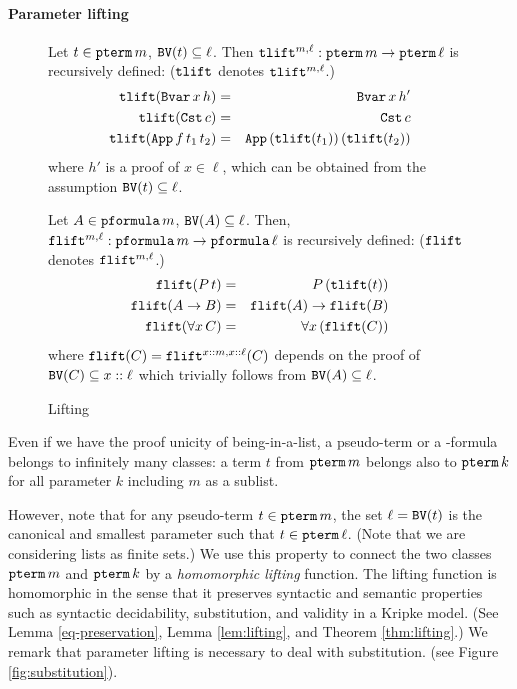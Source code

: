 \documentclass{svjour3}                     %
\newcommand{\tm}{\subseteq}
\newcommand{\tApp}{\textup{\tt App}}
\newcommand{\tBvar}{\textup{\tt Bvar}}
\newcommand{\tCst}{\textup{\tt Cst}}
\newcommand{\tFvar}{\textup{\tt Fvar}}
\newcommand{\tpterm}{\textup{\tt pterm}}
\newcommand{\tpfml}{\textup{\tt pformula}}
\newcommand{\tPH}{\textup{\tt BV}}
\newcommand{\ttlift}{\textup{\tt tlift}}
\newcommand{\tflift}{\textup{\tt flift}}
\begin{document}
\paragraph{\bf Parameter lifting}

\begin{figure}[t]
  Let $t \in \tpterm \,m$, $\tPH(t) \subseteq \ell$. Then $\ttlift^{m, \ell} : \tpterm\, m \to \tpterm \, \ell$ is recursively defined: ($\ttlift$ denotes $\ttlift^{m,\ell}$.)
 \begin{eqnarray}
    \ttlift(\tBvar\, x\, h) & = & \tBvar\, x\, h' \label{lift-side}\\
    \ttlift(\tCst\, c) & = & \tCst\, c \nonumber \\
    \ttlift (\tApp\, f\, t_1\, t_2) & = & \tApp\, (\ttlift (t_1))\, (\ttlift(t_2)) \nonumber
  \end{eqnarray}
where  $h'$ is a proof of $x \in \ell$, which can be obtained from the assumption $\tPH(t) \tm \ell$.\medskip

Let $A \in \tpfml \,m$, $\tPH(A) \subseteq \ell$. Then, $\tflift^{m, \ell} : \tpfml\, m \to \tpfml \, \ell$ is recursively defined: ($\tflift$ denotes $\tflift^{m,\ell}$.)
\begin{eqnarray*}
  \tflift(P\, t) & = &  P\, (\ttlift(t)) \\
  \tflift( A \to B) & = & \tflift(A) \to \tflift(B)\\
  \tflift(\forall x\, C) & = & \forall x\, (\tflift(C))
\end{eqnarray*}
where $\tflift(C) = \tflift^{x::m, x::\ell} (C)$ depends on the proof of $\tPH(C) \subseteq x:: \ell$ which trivially follows from $\tPH(A) \tm \ell$.

\hrulefill
  \caption{Lifting}
  \label{fig:lifting}
\end{figure}

Even if we have the proof unicity of being-in-a-list, a pseudo-term or a -formula belongs to infinitely many classes: a term $t$ from $\tpterm \, m$ belongs also to $\tpterm\, k$ for all parameter $k$ including $m$ as a sublist. 

However, note that for any pseudo-term $t \in \tpterm \, m$, the set $\ell = \tPH(t)$ is the canonical and smallest parameter such that $t\in \tpterm\, \ell$. (Note that we are considering lists as finite sets.)
We use this property to connect the two classes $\tpterm\, m$ and $\tpterm\, k$ by a {\it homomorphic lifting} function. 
The lifting function is homomorphic in the sense that it preserves syntactic and semantic properties such as syntactic decidability, substitution, and validity in a Kripke model. (See Lemma \ref{eq-preservation}, Lemma \ref{lem:lifting}, and Theorem \ref{thm:lifting}.)
We remark that parameter lifting is necessary to deal with substitution. (see Figure \ref{fig:substitution}).
\end{document}
